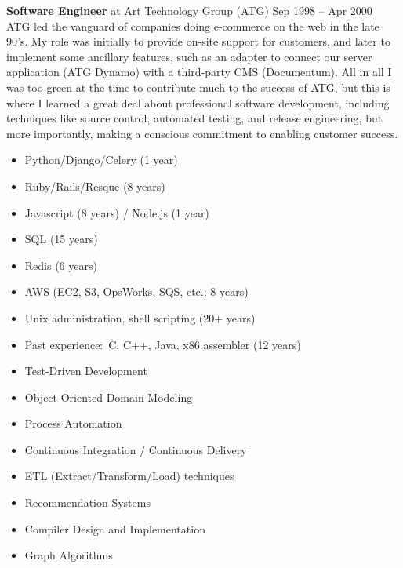 \documentclass[10pt]{article}
\begin{document}
\headedsection
  {\textbf{Software Engineer} at Art Technology Group (ATG)}
  {Sep 1998 -- Apr 2000}
  {\\ATG led the vanguard of companies doing e-commerce on the web in the late 90's. My role was
    initially to provide on-site support for customers, and later to implement some ancillary
    features, such as an adapter to connect our server application (ATG Dynamo) with a
    third-party CMS (Documentum).  All in all I was too green at the time to contribute much to
    the success of ATG, but this is where I learned a great deal about professional software
    development, including techniques like source control, automated testing, and release
    engineering, but more importantly, making a conscious commitment to enabling customer
    success.}



\spacedhrule{0.8em}{-0.4em}


\vspace{-1.0em}

\begin{multicols}{2}
\begin{itemize}
\item Python/Django/Celery (1 year)
\item Ruby/Rails/Resque (8 years)
\item Javascript (8 years) / Node.js (1 year)
\item SQL (15 years)
\item Redis (6 years)
\item AWS (EC2, S3, OpsWorks, SQS, etc.; 8 years)
\item Unix administration, shell scripting (20+ years)
\item Past experience:\ C, C++, Java, x86 assembler (12 years)
\item Test-Driven Development
\item Object-Oriented Domain Modeling
\item Process Automation
\item Continuous Integration / Continuous Delivery
\item ETL (Extract/Transform/Load) techniques
\item Recommendation Systems
\item Compiler Design and Implementation
\item Graph Algorithms
\end{itemize}
\end{multicols}
\end{document}

